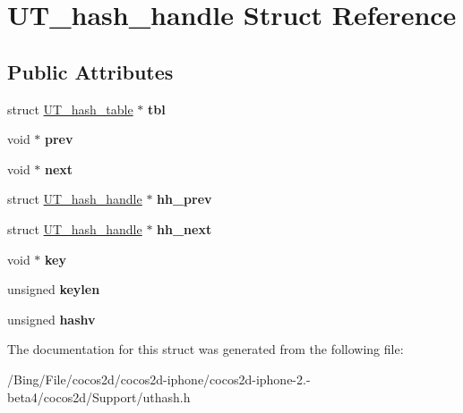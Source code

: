 \hypertarget{struct_u_t__hash__handle}{\section{U\-T\-\_\-hash\-\_\-handle Struct Reference}
\label{struct_u_t__hash__handle}
}
\subsection*{Public Attributes}
\begin{DoxyCompactItemize}
\item 
\hypertarget{struct_u_t__hash__handle_ad2035ee3b2aa55b22e352341372a5e73}{struct \hyperlink{struct_u_t__hash__table}{U\-T\-\_\-hash\-\_\-table} $\ast$ {\bfseries tbl}}\label{struct_u_t__hash__handle_ad2035ee3b2aa55b22e352341372a5e73}

\item 
\hypertarget{struct_u_t__hash__handle_abaf54a69367933df2d45575f48ca6a58}{void $\ast$ {\bfseries prev}}\label{struct_u_t__hash__handle_abaf54a69367933df2d45575f48ca6a58}

\item 
\hypertarget{struct_u_t__hash__handle_a93bc88ffe97f85ea0d9e0056b7118942}{void $\ast$ {\bfseries next}}\label{struct_u_t__hash__handle_a93bc88ffe97f85ea0d9e0056b7118942}

\item 
\hypertarget{struct_u_t__hash__handle_a3ec03e34d7975d5c1981c44b324619b2}{struct \hyperlink{struct_u_t__hash__handle}{U\-T\-\_\-hash\-\_\-handle} $\ast$ {\bfseries hh\-\_\-prev}}\label{struct_u_t__hash__handle_a3ec03e34d7975d5c1981c44b324619b2}

\item 
\hypertarget{struct_u_t__hash__handle_a4f6989385499ba6f594b0f0facd28325}{struct \hyperlink{struct_u_t__hash__handle}{U\-T\-\_\-hash\-\_\-handle} $\ast$ {\bfseries hh\-\_\-next}}\label{struct_u_t__hash__handle_a4f6989385499ba6f594b0f0facd28325}

\item 
\hypertarget{struct_u_t__hash__handle_a40690fc15aeaeba8f25385f05f84dd4d}{void $\ast$ {\bfseries key}}\label{struct_u_t__hash__handle_a40690fc15aeaeba8f25385f05f84dd4d}

\item 
\hypertarget{struct_u_t__hash__handle_af2abdc405972a6bbdee2ade2c0f346c4}{unsigned {\bfseries keylen}}\label{struct_u_t__hash__handle_af2abdc405972a6bbdee2ade2c0f346c4}

\item 
\hypertarget{struct_u_t__hash__handle_aae5e635fa110556e5007f627089f8323}{unsigned {\bfseries hashv}}\label{struct_u_t__hash__handle_aae5e635fa110556e5007f627089f8323}

\end{DoxyCompactItemize}


The documentation for this struct was generated from the following file\-:\begin{DoxyCompactItemize}
\item 
/\-Bing/\-File/cocos2d/cocos2d-\/iphone/cocos2d-\/iphone-\/2.-\/beta4/cocos2d/\-Support/uthash.\-h\end{DoxyCompactItemize}
